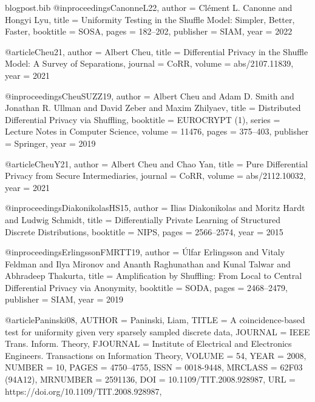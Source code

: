 \documentclass[11pt]{article}
\begin{document}
\begin{filecontents*}{blogpost.bib}
@inproceedings{CanonneL22,
  author    = {Cl{\'{e}}ment L. Canonne and
               Hongyi Lyu},
  title     = {Uniformity Testing in the Shuffle Model: Simpler, Better, Faster},
  booktitle = {{SOSA}},
  pages     = {182--202},
  publisher = {{SIAM}},
  year      = {2022}
}

@article{Cheu21,
  author    = {Albert Cheu},
  title     = {Differential Privacy in the Shuffle Model: {A} Survey of Separations},
  journal   = {CoRR},
  volume    = {abs/2107.11839},
  year      = {2021}
}

@inproceedings{CheuSUZZ19,
  author    = {Albert Cheu and
               Adam D. Smith and
               Jonathan R. Ullman and
               David Zeber and
               Maxim Zhilyaev},
  title     = {Distributed Differential Privacy via Shuffling},
  booktitle = {{EUROCRYPT} {(1)}},
  series    = {Lecture Notes in Computer Science},
  volume    = {11476},
  pages     = {375--403},
  publisher = {Springer},
  year      = {2019}
}

@article{CheuY21,
  author    = {Albert Cheu and
               Chao Yan},
  title     = {Pure Differential Privacy from Secure Intermediaries},
  journal   = {CoRR},
  volume    = {abs/2112.10032},
  year      = {2021}
}

@inproceedings{DiakonikolasHS15,
  author    = {Ilias Diakonikolas and
               Moritz Hardt and
               Ludwig Schmidt},
  title     = {Differentially Private Learning of Structured Discrete Distributions},
  booktitle = {{NIPS}},
  pages     = {2566--2574},
  year      = {2015}
}

@inproceedings{ErlingssonFMRTT19,
  author    = {{\'{U}}lfar Erlingsson and
               Vitaly Feldman and
               Ilya Mironov and
               Ananth Raghunathan and
               Kunal Talwar and
               Abhradeep Thakurta},
  title     = {Amplification by Shuffling: From Local to Central Differential Privacy
               via Anonymity},
  booktitle = {{SODA}},
  pages     = {2468--2479},
  publisher = {{SIAM}},
  year      = {2019}
}

@article{Paninski08,
    AUTHOR = {Paninski, Liam},
     TITLE = {A coincidence-based test for uniformity given very sparsely
              sampled discrete data},
   JOURNAL = {IEEE Trans. Inform. Theory},
  FJOURNAL = {Institute of Electrical and Electronics Engineers.
              Transactions on Information Theory},
    VOLUME = {54},
      YEAR = {2008},
    NUMBER = {10},
     PAGES = {4750--4755},
      ISSN = {0018-9448},
   MRCLASS = {62F03 (94A12)},
  MRNUMBER = {2591136},
       DOI = {10.1109/TIT.2008.928987},
       URL = {https://doi.org/10.1109/TIT.2008.928987},
}


\end{filecontents*}
\end{document}
